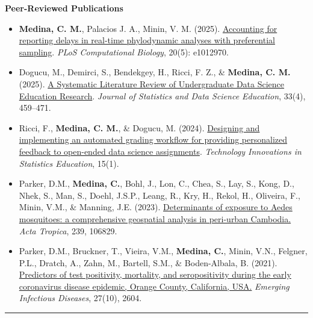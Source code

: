 \documentclass{article}
\begin{document}
	\begin{description}
		\vspace{-2mm}
		
		\item[Manuscripts] \hspace*{.1in} 
		
		\textbf{Peer-Reviewed Publications}
		\begin{itemize}
			\item \textbf{Medina, C. M.}, Palacios J. A., Minin, V. M. (2025). \href{https://doi.org/10.1371/journal.pcbi.1012970}{Accounting for reporting delays in real-time phylodynamic analyses with preferential sampling}. \textit{PLoS Computational Biology}, 20(5): e1012970.
			
			\item Dogucu, M., Demirci, S., Bendekgey, H., Ricci, F. Z., \& \textbf{Medina, C. M.} (2025). \href{https://doi.org/10.1080/26939169.2025.2486656}{A Systematic Literature Review of Undergraduate Data Science Education Research}. \textit{Journal of Statistics and Data Science Education}, 33(4), 459–471. 
			
			\item Ricci, F., \textbf{Medina, C. M.}, \& Dogucu, M. (2024). \href{https://doi.org/10.5070/T5.1886}{Designing and implementing an automated grading workflow for providing personalized feedback to open-ended data science assignments}. \textit{Technology Innovations in Statistics Education}, 15(1).
			
			\item Parker, D.M., \textbf{Medina, C.}, Bohl, J., Lon, C., Chea, S., Lay, S., Kong, D., Nhek, S., Man, S., Doehl, J.S.P., Leang, R., Kry, H., Rekol, H., Oliveira, F., Minin, V.M., \& Manning, J.E. (2023). \href{https://doi.org/10.1016/j.actatropica.2023.106829}{Determinants of exposure to Aedes mosquitoes: a comprehensive geospatial analysis in peri-urban Cambodia.} \textit{Acta Tropica}, 239, 106829. 
			
			\item Parker, D.M., Bruckner, T., Vieira, V.M., \textbf{Medina, C.}, Minin, V.N., Felgner, P.L., Dratch, A., Zahn, M., Bartell, S.M., \& Boden-Albala, B. (2021). \href{https://doi.org/10.3201/eid2710.210103}{Predictors of test positivity, mortality, and seropositivity during the early coronavirus disease epidemic, Orange County, California, USA.} \textit{Emerging Infectious Diseases}, 27(10), 2604.
		\end{itemize}	
		
	\end{description}
	\vspace{-2mm}
	\rule{\linewidth}{1pt}
	
\end{document}
